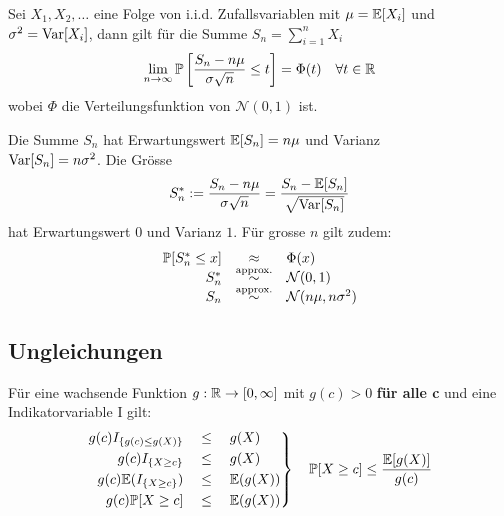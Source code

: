 \begin{theorem}[ZGS]
	Sei \(X_1,X_2,\ldots\) eine Folge von i.i.d. Zufallsvariablen mit \(\mu = \E[X_i]\) und
	\(\sigma^2 = \var[X_i]\), dann gilt für die Summe \(S_n = \sum_{i=1}^n X_i\)
	\[
		\lim_{n\rightarrow\infty} \P\left[ \frac{S_n-n\mu}{\sigma\sqrt{n}} \leq t \right] =
		\Phi(t) \quad \forall t \in \R
	\]
	wobei \(\Phi\)  die Verteilungsfunktion von \(\mathcal{N}(0,1)\) ist.
\end{theorem}

\begin{note}
	Die Summe \(S_n\) hat Erwartungswert \(\E[S_n] = n\mu\) und Varianz \\ \(\var[S_n] = n \sigma^2\).
	Die Grösse
	\[
		S_n^\ast := \frac{S_n-n\mu}{\sigma\sqrt{n}} = \frac{S_n - \E[S_n]}{\sqrt{\var[S_n]}}
	\]
	hat Erwartungswert \(0\) und Varianz \(1\). Für grosse \(n\) gilt zudem:
	\[\begin{array}{rcl}
			\P[S_n^\ast \leq x] & \approx                        & \Phi(x)                     \\
			S_n^\ast            & \overset{\text{approx.}}{\sim} & \mathcal{N}(0,1)            \\
			S_n                 & \overset{\text{approx.}}{\sim} & \mathcal{N}(n\mu,n\sigma^2)
		\end{array}\]
\end{note}



\subsection{Ungleichungen}

\begin{definition}[Markov]
	Für eine wachsende Funktion \(g: \R \rightarrow [0,\infty]\)
	mit \(g(c)>0\) \textbf{für alle c} und eine Indikatorvariable I gilt:
	\begin{eqnarray*}
		\left. {
		\begin{split}
			g(c) I_{\{g(c) \leq g(X)\}} 	&\quad\leq\quad		g(X)		\\
			g(c) I_{\{X \geq c\}} 			&\quad\leq\quad		g(X)		\\
			g(c) \E(I_{\{X \geq c\}})		&\quad\leq\quad		\E(g(X))	\\
			g(c) \P[X \geq c]				&\quad\leq\quad		\E(g(X))	\\
		\end{split}
		}\right\}	\quad 	\P[X \geq c] \leq \frac{\E[g(X)]}{g(c)}
	\end{eqnarray*}
\end{definition}

